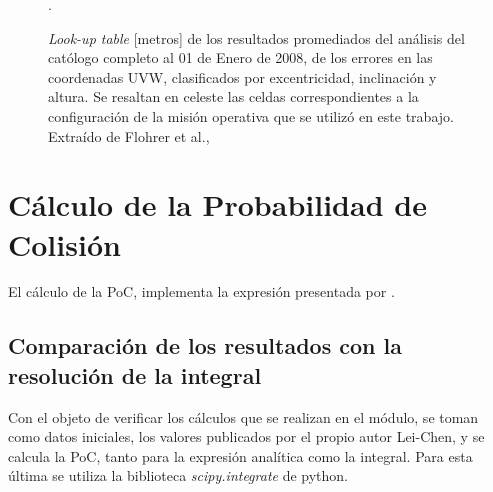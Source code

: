 \begin{figure}[!h]
  \centering
  \caption{{\it{Look-up table}} [metros] de los resultados promediados del an\'alisis del cat\'ologo completo al 01 de Enero de 2008, de los errores en las coordenadas UVW, clasificados por excentricidad, inclinaci\'on y altura. Se resaltan en celeste las celdas correspondientes a la configuraci\'on de la misi\'on operativa que se utiliz\'o en este trabajo. Extra\'ido de Flohrer et al., \citep{flohrer2008assessment}}.
  \label{fig:flohrer}
\end{figure}

% 

\section{C\'alculo de la Probabilidad de Colisi\'on}

El c\'alculo de la PoC, implementa la expresi\'on presentada por  \cite{leichen}.


\subsection*{Comparaci\'on de los resultados con la resoluci\'on de la integral}
Con el objeto de verificar los c\'alculos que se realizan en el m\'odulo, se toman como datos iniciales, los valores publicados por el propio autor Lei-Chen, y se calcula la PoC, tanto para la expresi\'on anal\'itica como la integral. Para esta \'ultima se utiliza la biblioteca {\it{scipy.integrate}}  de python.

